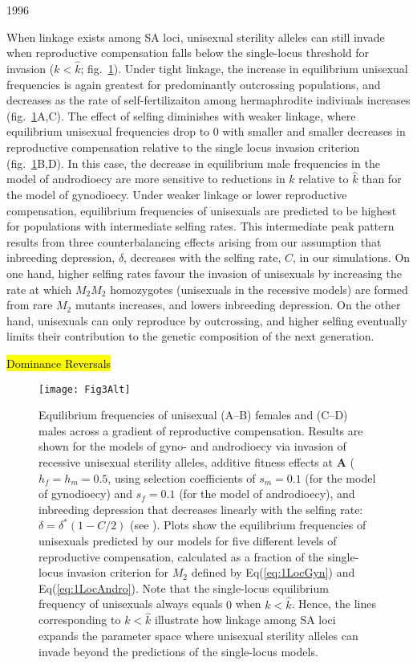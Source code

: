 1996\documentclass[9pt,twocolumn,twoside,lineno]{gsajnl}
\begin{document}
When linkage exists among SA loci, unisexual sterility alleles can still invade when reproductive compensation falls below the single-locus threshold for invasion ($k < \hat{k}$; fig.~\ref{fig:eqFreq}). Under tight linkage, the increase in equilibrium unisexual frequencies is again greatest for predominantly outcrossing populations, and decreases as the rate of self-fertilizaiton among hermaphrodite indiviuals increases (fig.~\ref{fig:eqFreq}A,C). The effect of selfing diminishes with weaker linkage, where equilibrium unisexual frequencies drop to $0$ with smaller and smaller decreases in reproductive compensation relative to the single locus invasion criterion (fig.~\ref{fig:eqFreq}B,D). In this case, the decrease in equilibrium male frequencies in the model of androdioecy are more sensitive to reductions in $k$ relative to $\hat{k}$ than for the model of gynodioecy. Under weaker linkage or lower reproductive compensation, equilibrium frequencies of unisexuals are predicted to be highest for populations with intermediate selfing rates. This intermediate peak pattern results from three counterbalancing effects arising from our assumption that inbreeding depression, $\delta$, decreases with the selfing rate, $C$, in our simulations. On one hand, higher selfing rates favour the invasion of unisexuals by increasing the rate at which $M_2 M_2$ homozygotes (unisexuals in the recessive models) are formed from rare $M_2$ mutants increases, and lowers inbreeding depression. On the other hand, unisexuals can only reproduce by outcrossing, and higher selfing eventually limits their contribution to the genetic composition of the next generation. 

\hl{Dominance Reversals}


\begin{figure}[htbp]
\centering
\texttt{[image: Fig3Alt]}
\caption{Equilibrium frequencies of unisexual (A--B) females and (C--D) males across a gradient of reproductive compensation. Results are shown for the models of gyno- and androdioecy via invasion of recessive unisexual sterility alleles, additive fitness effects at $\mathbf{A}$ ($h_f = h_m = 0.5$, using selection coefficients of $s_m = 0.1$ (for the model of gynodioecy) and $s_f = 0.1$ (for the model of androdioecy), and inbreeding depression that decreases linearly with the selfing rate: $\delta = \delta^\ast(1 - C/2)$ (see ). Plots show the equilibrium frequencies of unisexuals predicted by our models for five different levels of reproductive compensation, calculated as a fraction of the single-locus invasion criterion for $M_2$ defined by Eq(\ref{eq:1LocGyn}) and Eq(\ref{eq:1LocAndro}). Note that the single-locus equilibrium frequency of unisexuals always equals $0$ when $k < \hat{k}$. Hence, the lines corresponding to $k < \hat{k}$ illustrate how linkage among SA loci expands the parameter space where unisexual sterility alleles can invade beyond the predictions of the single-locus models.}
\label{fig:eqFreq}
\end{figure}
\end{document}
